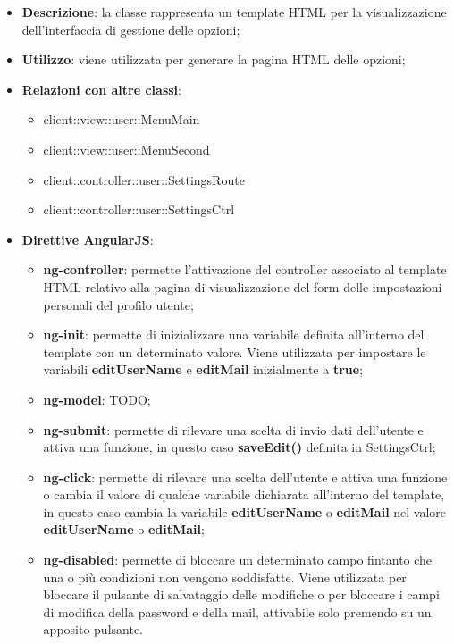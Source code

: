 			\begin{itemize}
				\item \textbf{Descrizione}: la classe rappresenta un template HTML per la visualizzazione dell'interfaccia di gestione delle opzioni;
				\item \textbf{Utilizzo}: viene utilizzata per generare la pagina HTML delle opzioni;
				\item \textbf{Relazioni con altre classi}:
					\begin{itemize}
						\item client::view::user::MenuMain
						\item client::view::user::MenuSecond
						\item client::controller::user::SettingsRoute
						\item client::controller::user::SettingsCtrl
					\end{itemize}
				\item \textbf{Direttive AngularJS}:
					\begin{itemize}
						\item \textbf{ng-controller}: permette l'attivazione del controller associato al template HTML relativo alla pagina di visualizzazione del form delle impostazioni personali del profilo utente;
						\item \textbf{ng-init}: permette di inizializzare una variabile definita all'interno del template con un determinato valore. Viene utilizzata per impostare le variabili \textbf{editUserName} e \textbf{editMail} inizialmente a \textbf{true};
						\item \textbf{ng-model}: TODO;
						\item \textbf{ng-submit}: permette di rilevare una scelta di invio dati dell'utente e attiva una funzione, in questo caso \textbf{saveEdit()} definita in SettingsCtrl;
						\item \textbf{ng-click}: permette di rilevare una scelta dell'utente e attiva una funzione o cambia il valore di qualche variabile dichiarata all'interno del template, in questo caso cambia la variabile \textbf{editUserName} o \textbf{editMail} nel valore \textbf{editUserName} o \textbf{editMail};
						\item \textbf{ng-disabled}: permette di bloccare un determinato campo fintanto che una o più condizioni non vengono soddisfatte. Viene utilizzata per bloccare il pulsante di salvataggio delle modifiche o per bloccare i campi di modifica della password e della mail, attivabile solo premendo su un apposito pulsante.
					\end{itemize}
			\end{itemize}

